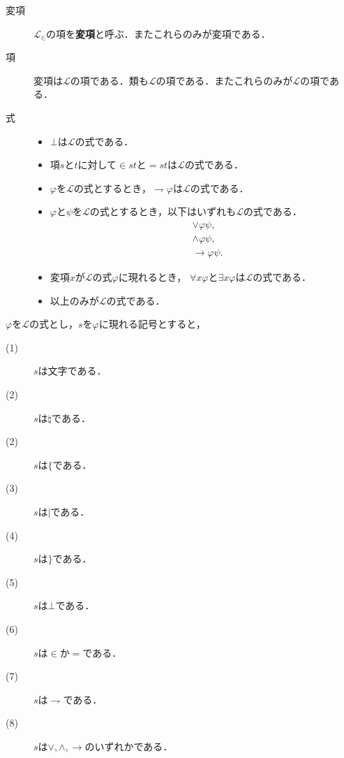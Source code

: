 	\begin{description}
		\item[変項] $\mathcal{L}_{\in}$の項を{\bf 変項}と呼ぶ．またこれらのみが変項である．
		
		\item[項] 変項は$\mathcal{L}$の項である．類も$\mathcal{L}$の項である．またこれらのみが$\mathcal{L}$の項である．
			
		\item[式] 
			\begin{itemize}
				\item $\bot$は$\mathcal{L}$の式である．
				\item 項$s$と$t$に対して$\in st$と$=st$は$\mathcal{L}$の式である．
				\item $\varphi$を$\mathcal{L}$の式とするとき，$\rightharpoondown \varphi$は$\mathcal{L}$の式である．
				\item $\varphi$と$\psi$を$\mathcal{L}$の式とするとき，以下はいずれも$\mathcal{L}$の式である．
					\begin{align}
						&\vee \varphi \psi, \\
						&\wedge \varphi \psi, \\
						&\rightarrow \varphi \psi.
					\end{align}
			
				\item 変項$x$が$\mathcal{L}$の式$\varphi$に現れるとき，
					$\forall x \varphi$と$\exists x \varphi$は$\mathcal{L}$の式である．
			
				\item 以上のみが$\mathcal{L}$の式である．
		\end{itemize}
	\end{description}
	
	$\varphi$を$\mathcal{L}$の式とし，$s$を$\varphi$に現れる記号とすると，
	\begin{description}
		\item[(1)] $s$は文字である．
		\item[(2)] $s$は$\natural$である．
		\item[(2)] $s$は$\{$である．
		\item[(3)] $s$は$|$である．
		\item[(4)] $s$は$\}$である．
		\item[(5)] $s$は$\bot$である．
		\item[(6)] $s$は$\in$か$=$である．
		\item[(7)] $s$は$\rightharpoondown$である．
		\item[(8)] $s$は$\vee,\wedge,\rightarrow$のいずれかである．
	\end{description}
	
